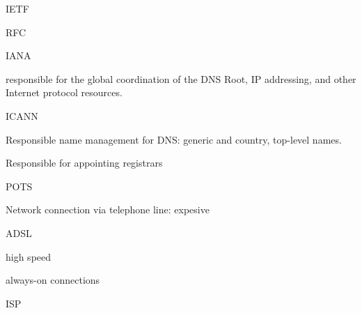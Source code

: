 \documentclass[main.tex]{subfiles}
\begin{document}
\small

\layer{}

\begin{card}{IETF}
\TODO
\end{card}

\begin{card}{RFC}
\TODO
\end{card}

\begin{card}{IANA}
\item responsible for the global coordination of the DNS Root, IP addressing, and other Internet protocol resources.
\end{card}

\begin{card}{ICANN}
\item Responsible name management for DNS: generic and country, top-level names.
\item Responsible for appointing registrars
\end{card}

\begin{card}{POTS}
\item Network connection via telephone line: expesive
\end{card}

\begin{card}{ADSL}
\item high speed
\item always-on connections
\end{card}

\begin{card}[TODO]{ISP}
\TODO
\end{card}
\end{document}
